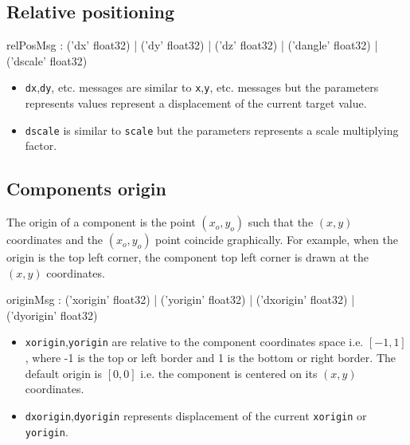 \documentclass[a4paper,twoside]{report}
\newcommand{\subsublevel}[1]	{\subsection{#1}}
\newcommand{\OSC}[1]		{\texttt{#1}}
\begin{document}
\subsublevel{Relative positioning}
\label{relpos}

\begin{rail}
relPosMsg :  
			('dx' float32)
		| 	('dy' float32)
		| 	('dz' float32)
		| 	('dangle' float32)
		| 	('dscale' float32) 
\end{rail}

\begin{itemize}
\item \OSC{dx},\OSC{dy}, etc. messages are similar to \OSC{x},\OSC{y}, etc. messages but the parameters represents values represent a displacement of the current target value.
\item \OSC{dscale} is similar to \OSC{scale} but the parameters represents a scale multiplying factor.
\end{itemize}

\subsublevel{Components origin}
\label{origin}

The origin of a component is the point $(x_o, y_o)$ such that the $(x, y)$ coordinates and the $(x_o, y_o)$ point coincide graphically. For example, when the origin is the top left corner, the component top left corner is drawn  at the $(x, y)$ coordinates.

\begin{rail}
originMsg :  
			('xorigin' float32)
		| 	('yorigin' float32)
		| 	('dxorigin' float32)
		| 	('dyorigin' float32)
\end{rail}

\begin{itemize}
\item \OSC{xorigin},\OSC{yorigin} are relative to the component coordinates space i.e. $[-1,1]$, where -1 is the top or left border and 1 is the bottom or right border. The default origin is $[0,0]$ i.e. the component is centered on its $(x,y)$ coordinates.
\item \OSC{dxorigin},\OSC{dyorigin} represents displacement of the current \OSC{xorigin} or \OSC{yorigin}.
\end{itemize}
\end{document}
